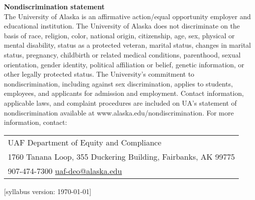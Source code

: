 \documentclass[12pt]{article}
\renewcommand{\emph}[1]{\textsf{\textbf{#1}}}
\def\mailto#1{\href{mailto:#1}{#1}}
\newcommand{\localhead}[1]{\par\smallskip\textbf{#1} \smallskip\nobreak\\}%
\def\subheading#1{\localhead{\emph{#1}}}
\begin{document}
\subheading{Nondiscrimination statement}
The University of Alaska is an affirmative action/equal opportunity employer and educational institution. The University of Alaska does not discriminate on the basis of race, religion, color, national origin, citizenship, age, sex, physical or mental disability, status as a protected veteran, marital status, changes in marital status, pregnancy, childbirth or related medical conditions, parenthood, sexual orientation, gender identity, political affiliation or belief, genetic information, or other legally protected status. The University's commitment to nondiscrimination, including against sex discrimination, applies to students, employees, and applicants for admission and employment. Contact information, applicable laws, and complaint procedures are included on UA's statement of nondiscrimination available at www.alaska.edu/nondiscrimination. For more information, contact:

\begin{tabular}{l}
UAF Department of Equity and Compliance\\
1760 Tanana Loop, 355 Duckering Building, Fairbanks, AK  99775\\
907-474-7300 \quad \mailto{uaf-deo@alaska.edu}
\end{tabular}

\hfill  \scriptsize [syllabus version: \today] \normalsize
\end{document}
